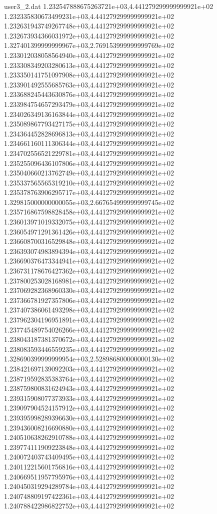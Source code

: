 \begin{filecontents}{user3_2.dat}
1.232547888675263721e+03,4.441279299999999921e+02
1.232335830673499231e+03,4.441279299999999921e+02
1.232631943749267748e+03,4.441279299999999921e+02
1.232673934366031972e+03,4.441279299999999921e+02
1.327401399999999967e+03,2.769153999999999769e+02
1.233012038058564940e+03,4.441279299999999921e+02
1.233308349203280613e+03,4.441279299999999921e+02
1.233350141751097908e+03,4.441279299999999921e+02
1.233901492555685763e+03,4.441279299999999921e+02
1.233688245443630876e+03,4.441279299999999921e+02
1.233984754657293479e+03,4.441279299999999921e+02
1.234026349136163844e+03,4.441279299999999921e+02
1.235089867793427175e+03,4.441279299999999921e+02
1.234364452828696813e+03,4.441279299999999921e+02
1.234661160111306344e+03,4.441279299999999921e+02
1.234702556521229781e+03,4.441279299999999921e+02
1.235255096436107806e+03,4.441279299999999921e+02
1.235040660213762749e+03,4.441279299999999921e+02
1.235337565565319210e+03,4.441279299999999921e+02
1.235378763906295717e+03,4.441279299999999921e+02
1.329815000000000055e+03,2.667654999999999745e+02
1.235716867598828458e+03,4.441279299999999921e+02
1.236013971019332075e+03,4.441279299999999921e+02
1.236054971291361426e+03,4.441279299999999921e+02
1.236608700316529848e+03,4.441279299999999921e+02
1.236393074983894394e+03,4.441279299999999921e+02
1.236690376473344941e+03,4.441279299999999921e+02
1.236731178676427362e+03,4.441279299999999921e+02
1.237800253028168981e+03,4.441279299999999921e+02
1.237069282368960330e+03,4.441279299999999921e+02
1.237366781927357806e+03,4.441279299999999921e+02
1.237407386061493298e+03,4.441279299999999921e+02
1.237962304196951891e+03,4.441279299999999921e+02
1.237745489754026266e+03,4.441279299999999921e+02
1.238043187381370672e+03,4.441279299999999921e+02
1.238083593446559235e+03,4.441279299999999921e+02
1.328690399999999954e+03,2.528986800000000130e+02
1.238421697139092203e+03,4.441279299999999921e+02
1.238719592835383764e+03,4.441279299999999921e+02
1.238759800831624943e+03,4.441279299999999921e+02
1.239315908077373933e+03,4.441279299999999921e+02
1.239097904524157912e+03,4.441279299999999921e+02
1.239395998289396630e+03,4.441279299999999921e+02
1.239436008216690880e+03,4.441279299999999921e+02
1.240510638262910788e+03,4.441279299999999921e+02
1.239774111909223848e+03,4.441279299999999921e+02
1.240072403743409495e+03,4.441279299999999921e+02
1.240112215601756816e+03,4.441279299999999921e+02
1.240669511957795976e+03,4.441279299999999921e+02
1.240450319294289784e+03,4.441279299999999921e+02
1.240748809197422361e+03,4.441279299999999921e+02
1.240788422986822752e+03,4.441279299999999921e+02

\end{filecontents}
